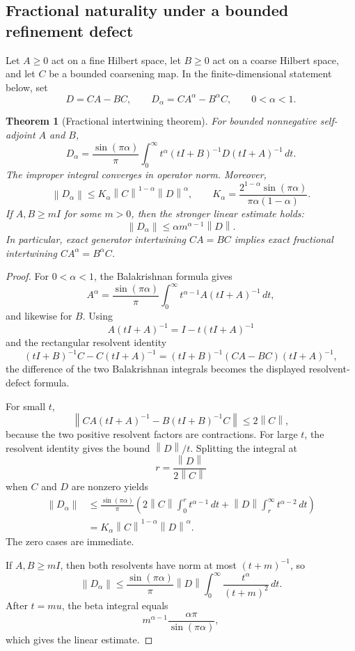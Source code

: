 \documentclass[11pt]{article}
\newtheorem{theorem}{Theorem}[section]
\theoremstyle{definition}
\theoremstyle{remark}
\newcommand{\norm}[1]{\left\lVert#1\right\rVert}
\begin{document}
\subsection{Fractional naturality under a bounded refinement defect}

Let $A\ge0$ act on a fine Hilbert space, let $B\ge0$ act on a coarse Hilbert space, and let $C$ be a bounded coarsening map.  In the finite-dimensional statement below, set
\[
D=CA-BC,
\qquad
D_\alpha=CA^\alpha-B^\alpha C,
\qquad 0<\alpha<1.
\]

\begin{theorem}[Fractional intertwining theorem]\label{thm:fractional-naturality}
For bounded nonnegative self-adjoint $A$ and $B$,
\[
\boxed{
D_\alpha
=
\frac{\sin(\pi\alpha)}{\pi}
\int_0^\infty
 t^\alpha(tI+B)^{-1}D(tI+A)^{-1}\,dt.
}
\]
The improper integral converges in operator norm.  Moreover,
\[
\boxed{
\norm{D_\alpha}
\le
K_\alpha\norm{C}^{1-\alpha}\norm{D}^{\alpha},
\qquad
K_\alpha=
\frac{2^{1-\alpha}\sin(\pi\alpha)}
{\pi\alpha(1-\alpha)}.
}
\]
If $A,B\ge mI$ for some $m>0$, then the stronger linear estimate holds:
\[
\boxed{
\norm{D_\alpha}
\le
\alpha m^{\alpha-1}\norm{D}.
}
\]
In particular, exact generator intertwining $CA=BC$ implies exact fractional intertwining $CA^\alpha=B^\alpha C$.
\end{theorem}

\begin{proof}
For $0<\alpha<1$, the Balakrishnan formula gives
\[
A^\alpha
=
\frac{\sin(\pi\alpha)}{\pi}
\int_0^\infty t^{\alpha-1}A(tI+A)^{-1}\,dt,
\]
and likewise for $B$.  Using
\[
A(tI+A)^{-1}=I-t(tI+A)^{-1}
\]
and the rectangular resolvent identity
\[
(tI+B)^{-1}C-C(tI+A)^{-1}
=
(tI+B)^{-1}(CA-BC)(tI+A)^{-1},
\]
the difference of the two Balakrishnan integrals becomes the displayed resolvent-defect formula.

For small $t$,
\[
\norm{CA(tI+A)^{-1}-B(tI+B)^{-1}C}
\le 2\norm C,
\]
because the two positive resolvent factors are contractions.  For large $t$, the resolvent identity gives the bound $\norm D/t$.  Splitting the integral at
\[
r=\frac{\norm D}{2\norm C}
\]
when $C$ and $D$ are nonzero yields
\[
\begin{aligned}
\norm{D_\alpha}
&\le
\frac{\sin(\pi\alpha)}{\pi}
\left(
2\norm C\int_0^r t^{\alpha-1}\,dt
+
\norm D\int_r^\infty t^{\alpha-2}\,dt
\right)\\
&=
K_\alpha\norm C^{1-\alpha}\norm D^\alpha.
\end{aligned}
\]
The zero cases are immediate.

If $A,B\ge mI$, then both resolvents have norm at most $(t+m)^{-1}$, so
\[
\norm{D_\alpha}
\le
\frac{\sin(\pi\alpha)}{\pi}\norm D
\int_0^\infty\frac{t^\alpha}{(t+m)^2}\,dt.
\]
After $t=mu$, the beta integral equals
\[
m^{\alpha-1}\frac{\alpha\pi}{\sin(\pi\alpha)},
\]
which gives the linear estimate.
\end{proof}
\end{document}
